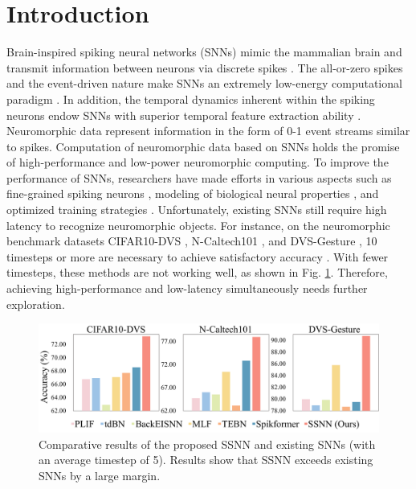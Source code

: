 \documentclass[letterpaper]{article} %
\begin{document}
\section{Introduction}
Brain-inspired spiking neural networks (SNNs) mimic the mammalian brain and transmit information between neurons via discrete spikes \cite{MAASS19971659}. The all-or-zero spikes and the event-driven nature make SNNs an extremely low-energy computational paradigm \cite{DENG2020294}. In addition, the temporal dynamics inherent within the spiking neurons endow SNNs with superior temporal feature extraction ability \cite{zuo2020spiking,ponghiran_spiking_2022,PALIF}. Neuromorphic data represent information in the form of 0-1 event streams similar to spikes. Computation of neuromorphic data based on SNNs holds the promise of high-performance and low-power neuromorphic computing.
To improve the performance of SNNs, researchers have made efforts in various aspects such as fine-grained spiking neurons \cite{PLIF,GLIF,ding2022biologically}, modeling of biological neural properties \cite{BackEISNN,sun2023multicompartment}, and optimized training strategies \cite{TET,Guo_2022_CVPR}. Unfortunately, existing SNNs still require high latency to recognize neuromorphic objects. For instance, on the neuromorphic benchmark datasets CIFAR10-DVS \cite{CIFAR10-DVS}, N-Caltech101 \cite{N-Caltech101}, and DVS-Gesture \cite{DVS-Gesture}, 10 timesteps or more are necessary to achieve satisfactory accuracy \cite{MLF,GLIF}. With fewer timesteps, these methods are not working well, as shown in Fig. \ref{cal1}. Therefore, achieving high-performance and low-latency simultaneously needs further exploration.
\begin{figure}[t]
\centering
\includegraphics[width=0.98\columnwidth]{cal1}
\caption{Comparative results of the proposed SSNN and existing SNNs (with an average timestep of 5). Results show that SSNN exceeds existing SNNs by a large margin.}
\label{cal1}
\end{figure}
\end{document}
